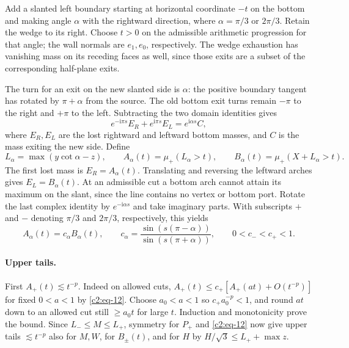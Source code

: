 Add a slanted left boundary starting at horizontal coordinate $-t$ on the
bottom and making angle $\alpha$ with the rightward direction, where
$\alpha=\pi/3$ or $2\pi/3$.  Retain the wedge to its right.  Choose
$t>0$ on the admissible arithmetic progression for that angle; the wall
normals are $e_1,e_0$, respectively.  The wedge exhaustion has vanishing
mass on its receding faces as well, since those exits are a subset of the
corresponding half-plane exits.

The turn for an exit on the new slanted side is $\alpha$: the positive
boundary tangent has rotated by $\pi+\alpha$ from the source.  The
old bottom exit turns remain $-\pi$ to the right and $+\pi$ to the
left.  Subtracting the two domain identities gives
\[
 e^{-\mathrm i\pi s}E_R+e^{\mathrm i\pi s}E_L
 =e^{\mathrm i\alpha s}C,
\]
where $E_R,E_L$ are the lost rightward and leftward bottom masses, and
$C$ is the mass exiting the new side.  Define
\[
 L_\alpha=\max(y\cot\alpha-z),\qquad
 A_\alpha(t)=\mu_+(L_\alpha>t),\qquad
 B_\alpha(t)=\mu_+(X+L_\alpha>t).
\]
The first lost mass is $E_R=A_\alpha(t)$.  Translating and reversing
the leftward arches gives $E_L=B_\alpha(t)$.  At an admissible cut a
bottom arch cannot attain its maximum on the slant, since the line
contains no vertex or bottom port.  Rotate the last complex identity by
$e^{-\mathrm i\alpha s}$ and take imaginary parts.  With subscripts
$+$ and $-$ denoting $\pi/3$ and $2\pi/3$, respectively, this yields
\begin{equation}
 A_\alpha(t)=c_\alpha B_\alpha(t),\qquad
 c_\alpha=\frac{\sin(s(\pi-\alpha))}{\sin(s(\pi+\alpha))},
 \qquad 0<c_-<c_+<1.
 \label{c2:eq-13}
\end{equation}

\paragraph{Upper tails.}
First \(A_+(t)\lesssim t^{-p}\). Indeed on allowed cuts,
\(A_+(t)\le c_+[A_+(a t)+O(t^{-p})]\) for fixed \(0<a<1\) by \eqref{c2:eq-12}. Choose \(a_0<a<1\) so \(c_+ a_0^{-p}<1\), and round \(a t\) down to an allowed cut still \(\ge a_0 t\) for large \(t\). Induction and monotonicity prove the bound. Since \(L_-\le M\le L_+\), symmetry for \(P_+\) and \eqref{c2:eq-12} now give upper tails \(\lesssim t^{-p}\) also for \(M,W\), for \(B_\pm(t)\), and for \(H\) by \(H/\sqrt3\le L_++\max z\).

